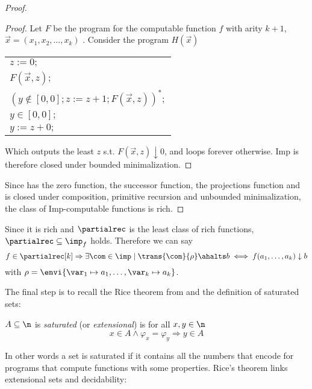 \begin{proof}
  \begin{proof}
    Let \(F\) be the program for the computable function \(f\)
    with arity \(k+1\), \(\vec{x} = (x_1, x_2, \dots, x_k)\)
    . Consider the program \(H(\vec{x})\)
    \begin{center}
      \begin{tabular}{l}
        \(z := 0;\)\\[0pt]
        \(F(\vec{x},z);\)\\[0pt]
        \((y \not\in [0,0];z := z + 1;F(\vec{x},z))^*;\)\\[0pt]
        \(y\in [0,0];\)\\[0pt]
        \(y := z + 0;\)\\[0pt]
      \end{tabular}

    \end{center}
    Which outputs the least \(z\) s.t. \(F(\vec{x},z) \downarrow 0\),
    and loops forever otherwise. Imp is therefore closed under bounded
    minimalization.
  \end{proof}
  Since has the zero function, the successor function, the projections
  function and is closed under composition, primitive recursion and
  unbounded minimalization, the class of Imp-computable functions is
  rich.
\end{proof}

Since it is rich and \(\partialrec\) is the least class of rich
functions, \(\partialrec \subseteq \imp_f\) holds. Therefore we can
say \[f \in \partialrec[k] \Rightarrow \exists \com \in \imp \mid
\trans{\com}{\rho}\ahalts b \iff f(a_1, \dots, a_k) \downarrow b\]
with \(\rho = \envi{\var_1 \mapsto a_1, \dots, \var_k \mapsto a_k}\).

The final step is to recall the Rice theorem from
\cite{rice1953classes} and the definition of saturated sets:

\begin{definition}
  \(A \subseteq \n\) is \emph{saturated} (or \emph{extensional}) is
  for all \(x,y\in\n\)
  \begin{equation*}
    x \in A \wedge \varphi_x = \varphi_y \Rightarrow y \in A
  \end{equation*}
\end{definition}

In other words a set is saturated if it contains all the numbers that
encode for programs that compute functions with some
properties. Rice's theorem links extensional sets and decidability:

